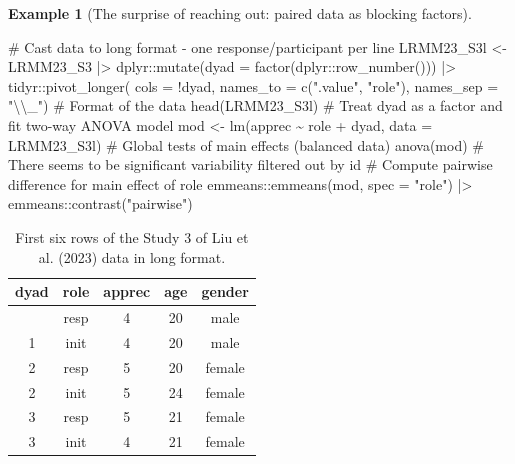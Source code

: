\documentclass[
  11pt,
  letterpaper,
]{scrbook}
\newenvironment{Shaded}{\begin{snugshade}}{\end{snugshade}}
\newcommand{\AttributeTok}[1]{\textcolor[rgb]{0.40,0.45,0.13}{#1}}
\newcommand{\CommentTok}[1]{\textcolor[rgb]{0.37,0.37,0.37}{#1}}
\newcommand{\FunctionTok}[1]{\textcolor[rgb]{0.28,0.35,0.67}{#1}}
\newcommand{\NormalTok}[1]{\textcolor[rgb]{0.00,0.23,0.31}{#1}}
\newcommand{\OtherTok}[1]{\textcolor[rgb]{0.00,0.23,0.31}{#1}}
\newcommand{\SpecialCharTok}[1]{\textcolor[rgb]{0.37,0.37,0.37}{#1}}
\newcommand{\StringTok}[1]{\textcolor[rgb]{0.13,0.47,0.30}{#1}}
\theoremstyle{definition}
\newtheorem{example}{Example}[chapter]
\theoremstyle{definition}
\theoremstyle{remark}
\begin{document}
\begin{example}[The surprise of reaching out: paired data as blocking
factors]
\begin{Shaded}
\begin{Highlighting}[]
\CommentTok{\# Cast data to long format {-} one response/participant per line}
\NormalTok{LRMM23\_S3l }\OtherTok{\textless{}{-}}\NormalTok{ LRMM23\_S3 }\SpecialCharTok{|\textgreater{}}
\NormalTok{  dplyr}\SpecialCharTok{::}\FunctionTok{mutate}\NormalTok{(}\AttributeTok{dyad =} \FunctionTok{factor}\NormalTok{(dplyr}\SpecialCharTok{::}\FunctionTok{row\_number}\NormalTok{())) }\SpecialCharTok{|\textgreater{}} 
\NormalTok{  tidyr}\SpecialCharTok{::}\FunctionTok{pivot\_longer}\NormalTok{(}
    \AttributeTok{cols =} \SpecialCharTok{!}\NormalTok{dyad, }
    \AttributeTok{names\_to =} \FunctionTok{c}\NormalTok{(}\StringTok{".value"}\NormalTok{, }\StringTok{"role"}\NormalTok{),}
    \AttributeTok{names\_sep =} \StringTok{"}\SpecialCharTok{\textbackslash{}\textbackslash{}}\StringTok{\_"}\NormalTok{)}
\CommentTok{\# Format of the data}
\FunctionTok{head}\NormalTok{(LRMM23\_S3l)}
\CommentTok{\# Treat dyad as a factor and fit two{-}way ANOVA model}
\NormalTok{mod }\OtherTok{\textless{}{-}} \FunctionTok{lm}\NormalTok{(apprec }\SpecialCharTok{\textasciitilde{}}\NormalTok{ role }\SpecialCharTok{+}\NormalTok{ dyad, }\AttributeTok{data =}\NormalTok{ LRMM23\_S3l)}
\CommentTok{\# Global tests of main effects (balanced data)}
\FunctionTok{anova}\NormalTok{(mod) }\CommentTok{\# There seems to be significant variability filtered out by \textquotesingle{}id\textquotesingle{}}
\CommentTok{\# Compute pairwise difference for main effect of \textquotesingle{}role\textquotesingle{}}
\NormalTok{emmeans}\SpecialCharTok{::}\FunctionTok{emmeans}\NormalTok{(mod, }\AttributeTok{spec =} \StringTok{"role"}\NormalTok{) }\SpecialCharTok{|\textgreater{}}
\NormalTok{  emmeans}\SpecialCharTok{::}\FunctionTok{contrast}\NormalTok{(}\StringTok{"pairwise"}\NormalTok{)}
\end{Highlighting}
\end{Shaded}

\begin{longtable}[]{@{}ccccc@{}}

\caption{\label{tbl-longdat}First six rows of the Study 3 of Liu et al.
(2023) data in long format.}

\tabularnewline

\toprule\noalign{}
dyad & role & apprec & age & gender \\
\midrule\noalign{}
\endhead
\bottomrule\noalign{}
\endlastfoot
1 & resp & 4 & 20 & male \\
1 & init & 4 & 20 & male \\
2 & resp & 5 & 20 & female \\
2 & init & 5 & 24 & female \\
3 & resp & 5 & 21 & female \\
3 & init & 4 & 21 & female \\


\end{longtable}
\end{example}
\end{document}
